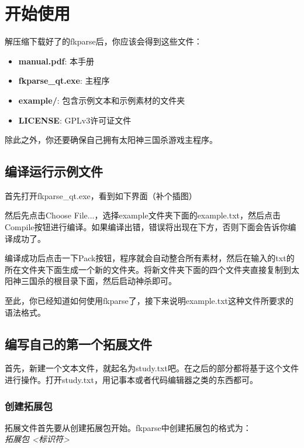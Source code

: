 \chapter{开始使用}

解压缩下载好了的fkparse后，你应该会得到这些文件：

\begin{itemize}
 \item \textbf{manual.pdf}: 本手册
 \item \textbf{fkparse\_qt.exe}: 主程序
 \item \textbf{example/}: 包含示例文本和示例素材的文件夹
 \item \textbf{LICENSE}: GPLv3许可证文件
\end{itemize}

除此之外，你还要确保自己拥有太阳神三国杀游戏主程序。

\section{编译运行示例文件}

首先打开fkparse\_qt.exe，看到如下界面（补个插图）

然后先点击Choose File...，选择example文件夹下面的example.txt，然后点击Compile按钮进行编译。如果编译出错，错误将出现在下方，否则下面会告诉你编译成功了。

编译成功后点击一下Pack按钮，程序就会自动整合所有素材，然后在输入的txt的所在文件夹下面生成一个新的文件夹。将新文件夹下面的四个文件夹直接复制到太阳神三国杀的根目录下面，然后启动神杀即可。

至此，你已经知道如何使用fkparse了，接下来说明example.txt这种文件所要求的语法格式。

\section{编写自己的第一个拓展文件}

首先，新建一个文本文件，就起名为study.txt吧。在之后的部分都将基于这个文件进行操作。打开study.txt，用记事本或者代码编辑器之类的东西都可。

\subsection{创建拓展包}

拓展文件首先要从创建拓展包开始。fkparse中创建拓展包的格式为：\\

\emph{拓展包 <标识符>} \\

